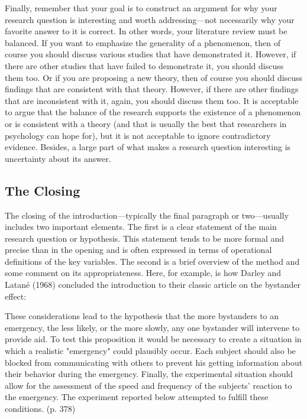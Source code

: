 Finally, remember that your goal is to construct an argument for why your research question is interesting and worth addressing---not necessarily why your favorite answer to it is correct. In other words, your literature review must be balanced. If you want to emphasize the generality of a phenomenon, then of course you should discuss various studies that have demonstrated it. However, if there are other studies that have failed to demonstrate it, you should discuss them too. Or if you are proposing a new theory, then of course you should discuss findings that are consistent with that theory. However, if there are other findings that are inconsistent with it, again, you should discuss them too. It is acceptable to argue that the balance of the research supports the existence of a phenomenon or is consistent with a theory (and that is usually the best that researchers in psychology can hope for), but it is not acceptable to ignore contradictory evidence. Besides, a large part of what makes a research question interesting is uncertainty about its answer.

\subsection{The Closing}

The closing of the introduction---typically the final paragraph or two---usually includes two important elements. The first is a clear statement of the main research question or hypothesis. This statement tends to be more formal and precise than in the opening and is often expressed in terms of operational definitions of the key variables. The second is a brief overview of the method and some comment on its appropriateness. Here, for example, is how Darley and Latané (1968) concluded the introduction to their classic article on the bystander effect:

These considerations lead to the hypothesis that the more bystanders to an emergency, the less likely, or the more slowly, any one bystander will intervene to provide aid. To test this proposition it would be necessary to create a situation in which a realistic "emergency" could plausibly occur. Each subject should also be blocked from communicating with others to prevent his getting information about their behavior during the emergency. Finally, the experimental situation should allow for the assessment of the speed and frequency of the subjects' reaction to the emergency. The experiment reported below attempted to fulfill these conditions. (p. 378)

